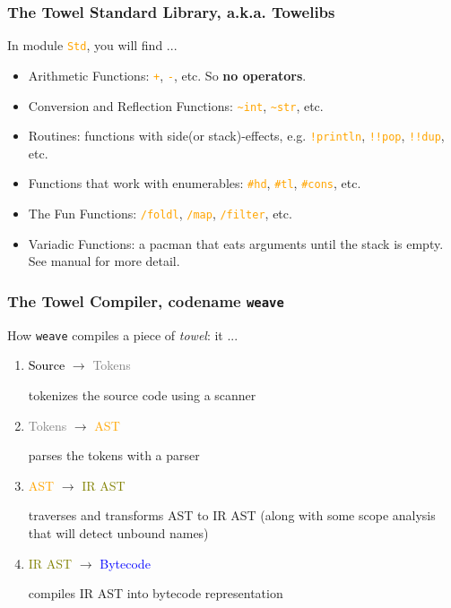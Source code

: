 \documentclass[10pt, compress, handout]{beamer}
\newcommand{\mnmt}[1]{\textcolor{orange}{\texttt{#1}}}
\begin{document}
\begin{frame}[fragile]
  \frametitle{The Towel Standard Library, a.k.a. Towelibs}

  In module \mnmt{Std}, you will find ...
  \pause
  \begin{itemize}[<+->]
  \item Arithmetic Functions: \mnmt{+}, \mnmt{-}, etc. So \textbf{no operators}.
  \item Conversion and Reflection Functions: \mnmt{\textasciitilde int}, \mnmt{\textasciitilde str}, etc.
  \item Routines: functions with side(or stack)-effects, e.g. \mnmt{!println}, \mnmt{!!pop}, \mnmt{!!dup}, etc.
  \item Functions that work with enumerables: \mnmt{\#hd}, \mnmt{\#tl}, \mnmt{\#cons}, etc.
  \item The Fun Functions: \mnmt{/foldl}, \mnmt{/map}, \mnmt{/filter}, etc.
  \item Variadic Functions: a pacman that eats arguments until the stack is empty. See manual for more detail.
  \end{itemize}
\end{frame}

\begin{frame}[fragile]
  \frametitle{The Towel Compiler, codename \texttt{weave}}

  How \texttt{weave} compiles a piece of \textit{towel}: it ...
  \begin{enumerate}[<+->]
  \item \textcolor{black}{Source} $\rightarrow$ \textcolor{gray}{Tokens}

    tokenizes the source code using a scanner
  \item \textcolor{gray}{Tokens} $\rightarrow$ \textcolor{orange}{AST}

    parses the tokens with a parser
  \item \textcolor{orange}{AST} $\rightarrow$ \textcolor{olive}{IR AST}

    traverses and transforms AST to IR AST (along with some scope analysis that will detect unbound names)

  \item \textcolor{olive}{IR AST} $\rightarrow$ \textcolor{blue}{Bytecode}

    compiles IR AST into bytecode representation
  \end{enumerate}

\end{frame}
\end{document}
